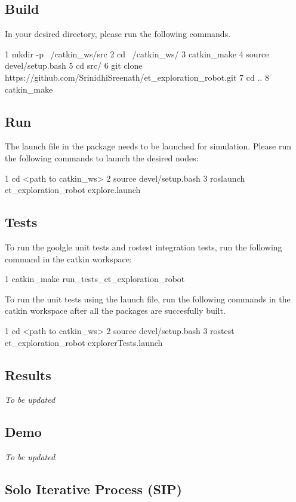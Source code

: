 \subsection*{Build}

In your desired directory, please run the following commands. 
\begin{DoxyCode}
1 mkdir -p ~/catkin\_ws/src
2 cd ~/catkin\_ws/
3 catkin\_make
4 source devel/setup.bash
5 cd src/
6 git clone https://github.com/SrinidhiSreenath/et\_exploration\_robot.git
7 cd ..
8 catkin\_make
\end{DoxyCode}
 \subsection*{Run}

The launch file in the package needs to be launched for simulation. Please run the following commands to launch the desired nodes\+: 
\begin{DoxyCode}
1 cd <path to catkin\_ws>
2 source devel/setup.bash
3 roslaunch et\_exploration\_robot explore.launch
\end{DoxyCode}
 \subsection*{Tests}

To run the goolgle unit tests and rostest integration tests, run the following command in the catkin workspace\+: 
\begin{DoxyCode}
1 catkin\_make run\_tests\_et\_exploration\_robot
\end{DoxyCode}
 To run the unit tests using the launch file, run the following commands in the catkin workspace after all the packages are succesfully built. 
\begin{DoxyCode}
1 cd <path to catkin\_ws>
2 source devel/setup.bash
3 rostest et\_exploration\_robot explorerTests.launch 
\end{DoxyCode}
 \subsection*{Results}

{\itshape To be updated}

\subsection*{Demo}

{\itshape To be updated}

\subsection*{Solo Iterative Process (S\+IP)}

